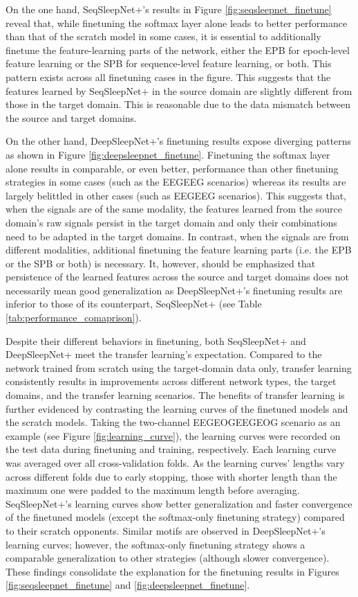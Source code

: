 \documentclass[journal,twoside,web]{ieeecolor}
\begin{document}
On the one hand, SeqSleepNet+'s results in Figure \ref{fig:seqsleepnet_finetune} reveal that, while finetuning the softmax layer alone leads to better performance than that of the scratch model in some cases, it is essential to additionally finetune the feature-learning parts of the network, either the EPB for epoch-level feature learning or the SPB for sequence-level feature learning, or both. This pattern exists across all finetuning cases in the figure. This suggests that the features learned by SeqSleepNet+ in the source domain are slightly different from those in the target domain. This is reasonable due to the data mismatch between the source and target domains.

On the other hand, DeepSleepNet+'s finetuning results expose diverging patterns as shown in Figure \ref{fig:deepsleepnet_finetune}. Finetuning the softmax layer alone results in comparable, or even better, performance than other finetuning strategies in some cases (such as the EEGEEG scenarios) whereas its results are largely belittled in other cases (such as EEGEEG scenarios). This suggests that, when the signals are of the same modality, the features learned from the source domain's raw signals persist in the target domain and only their combinations need to be adapted in the target domains. In contrast, when the signals are from different modalities, additional finetuning the feature learning parts (i.e. the EPB or the SPB or both) is necessary. It, however, should be emphasized that persistence of the learned features across the source and target domains does not necessarily mean good generalization as DeepSleepNet+'s finetuning results are inferior to those of its counterpart, SeqSleepNet+ (see Table \ref{tab:performance_comaprison}).


Despite their different behaviors in finetuning, both SeqSleepNet+ and DeepSleepNet+ meet the transfer learning's expectation. Compared to the network trained from scratch using the target-domain data only, transfer learning consistently results in improvements across different network types, the target domains, and the transfer learning scenarios. The benefits of transfer learning is further evidenced by contrasting the learning curves of the finetuned models and the scratch models. Taking the two-channel EEGEOGEEGEOG scenario as an example (see Figure \ref{fig:learning_curve}), the learning curves were recorded on the test data during finetuning and training, respectively. Each learning curve was averaged over all cross-validation folds. As the learning curves' lengths vary across different folds due to early stopping, those with shorter length than the maximum one were padded to the maximum length before averaging. SeqSleepNet+'s learning curves show better generalization and faster convergence of the finetuned models (except the softmax-only finetuning strategy) compared to their scratch opponents. Similar motifs are observed in DeepSleepNet+'s learning curves; however, the softmax-only finetuning strategy shows a comparable generalization to other strategies (although slower convergence). These findings consolidate the explanation for the finetuning results in Figures \ref{fig:seqsleepnet_finetune} and \ref{fig:deepsleepnet_finetune}.
\end{document}
